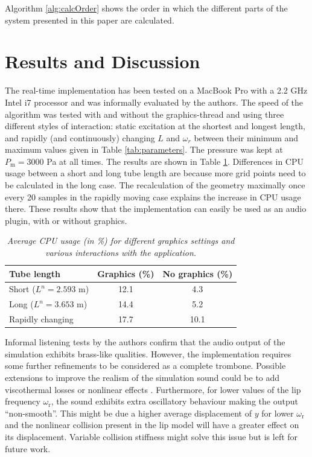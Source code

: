Algorithm \ref{alg:calcOrder} shows the order in which the different parts of the system presented in this paper are calculated. 


\section{Results and Discussion}\label{sec:resDisc}
The real-time implementation has been tested on a MacBook Pro with a 2.2 GHz Intel i7 processor and was informally evaluated by the authors. The speed of the algorithm was tested with and without the graphics-thread and using three different styles of interaction: static excitation at the shortest and longest length, and rapidly (and continuously) changing $L$ and $\omega_r$ between their minimum and maximum values given in Table \ref{tab:parameters}. The pressure was kept at $P_\text{m} = 3000$ Pa at all times. The results are shown in Table \ref{tab:CPU}. Differences in CPU usage between a short and long tube length are because more grid points need to be calculated in the long case. The recalculation of the geometry maximally once every 20 samples in the rapidly moving case explains the increase in CPU usage there. %
These results show that the implementation can easily be used as an audio plugin, with or without graphics.
\begin{table}[ht]
    \small
    \begin{center}
    \caption{\it Average CPU usage (in \%) for different graphics settings and various interactions with the application. \label{tab:CPU}}
    \begin{tabular}{|l|c|c|}
        \hline
        Tube length & Graphics (\%) & No graphics (\%)\\\hline
        Short ($L^n = 2.593$ m) & 12.1 & 4.3\\
        Long ($L^n = 3.653$ m) & 14.4 & 5.2 
        \\
        Rapidly changing & 17.7 & 10.1\\\hline    \end{tabular}
    \end{center}
\end{table}

Informal listening tests by the authors confirm that the audio output of the simulation exhibits brass-like qualities. However, the implementation requires some further refinements to be considered as a complete trombone. Possible extensions to improve the realism of the simulation sound could be to add viscothermal losses \cite{Harrison2016} or nonlinear effects \cite{msallam1997physical}. Furthermore, for lower values of the lip frequency $\omega_\text{r}$, the sound exhibits extra oscillatory behaviour making the output ``non-smooth''. This might be due a higher average displacement of $y$ for lower $\omega_\text{r}$ and the nonlinear collision present in the lip model will have a greater effect on its displacement. Variable collision stiffness might solve this issue but is left for future work.

